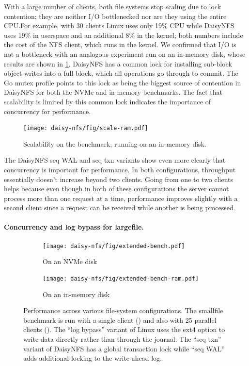 With a large number of clients, both file systems
stop scaling due to lock contention; they are neither I/O bottlenecked nor are
they using the entire CPU.\@ For example, with 30 clients Linux uses only 19\% CPU
while DaisyNFS uses 19\% in userspace and an additional 8\% in the kernel; both
numbers include the cost of the NFS client, which runs in the kernel. We
confirmed that I/O is not a bottleneck with an analogous experiment run on an in-memory disk,
whose results are shown in \cref{fig:eval:scale:ram}. DaisyNFS has a common
lock for installing sub-block object writes into a full block, which all
operations go through to commit. The Go mutex profile points to this lock as
being the biggest source of contention in DaisyNFS for both the NVMe and
in-memory benchmarks. The fact that scalability is limited by this common lock indicates the importance of concurrency for performance.

\begin{figure}[ht]
  \centering
  \texttt{[image: daisy-nfs/fig/scale-ram.pdf]}
  \caption[Concurrent smallfile performance on in-memory disk]%
  {Scalability on the  benchmark, running on an in-memory disk.}
  \label{fig:eval:scale:ram}
\end{figure}


The DaisyNFS seq WAL and seq txn variants show even more clearly that
concurrency is important for performance. In both configurations, throughput
essentially doesn't increase beyond two clients. Going from one to two clients
helps because even though in
both of these configurations the server cannot process more than one request at
a time, performance improves slightly with a second client since a request can
be received while another is being processed.

\paragraph{Concurrency and log bypass for largefile.}

\begin{figure}[hp]
  \begin{subfigure}[b]{\textwidth}
    \texttt{[image: daisy-nfs/fig/extended-bench.pdf]}
    \caption{On an NVMe disk}
    \label{fig:bench-configs:nvme}
  \end{subfigure}

  \begin{subfigure}[b]{\textwidth}
    \texttt{[image: daisy-nfs/fig/extended-bench-ram.pdf]}
    \caption{On an in-memory disk}
    \label{fig:bench-configs:ram}
  \end{subfigure}
  \caption[Benchmarks across file-system configurations]%
  {Performance across various file-system configurations. The smallfile
    benchmark is run with a single client () and also with 25
    parallel clients (). The ``log bypass'' variant of Linux
    uses the  ext4 option to write data directly rather than through the
    journal. The ``seq txn'' variant of DaisyNFS has a global transaction lock
    while ``seq WAL'' adds additional locking to the write-ahead log.}
  \label{fig:bench-configs}
\end{figure}

